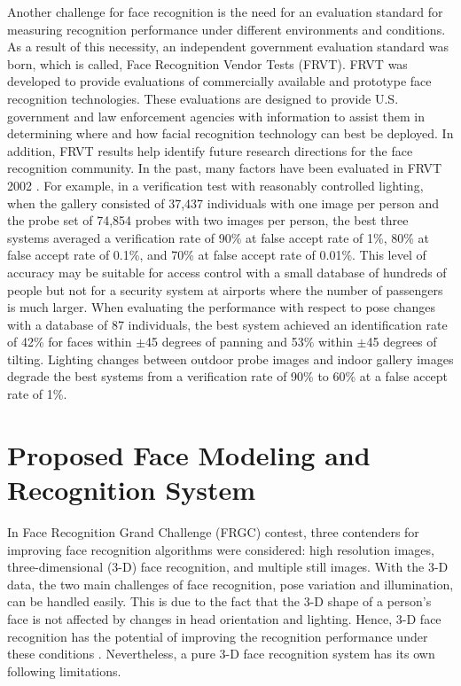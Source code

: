 Another challenge for face recognition is the need for an evaluation
standard for measuring recognition performance under different
environments and conditions. As a result of this necessity, an
independent government evaluation standard was born, which is
called, Face Recognition Vendor Tests (FRVT). FRVT was developed to
provide evaluations of commercially available and prototype face
recognition technologies. These evaluations are designed to provide
U.S. government and law enforcement agencies with information to
assist them in determining where and how facial recognition
technology can best be deployed. In addition, FRVT results help
identify future research directions for the face recognition
community. In the past, many factors have been evaluated in FRVT
2002 \cite{FRVT2002}. For example, in a verification test with
reasonably controlled lighting, when the gallery consisted of 37,437
individuals with one image per person and the probe set of 74,854
probes with two images per person, the best three systems averaged a
verification rate of 90\% at false accept rate of 1\%, 80\% at false
accept rate of 0.1\%, and 70\% at false accept rate of 0.01\%. This
level of accuracy may be suitable for access control with a small
database of hundreds of people but not for a security system at
airports where the number of passengers is much larger. When
evaluating the performance with respect to pose changes with a
database of 87 individuals, the best system achieved an
identification rate of 42\% for faces within $\pm$45 degrees of
panning and 53\% within $\pm$45 degrees of tilting. Lighting changes
between outdoor probe images and indoor gallery images degrade the
best systems from a verification rate of 90\% to 60\% at a false
accept rate of 1\%.

\section{Proposed Face Modeling and Recognition System}
In Face Recognition Grand Challenge (FRGC) contest, three contenders
for improving face recognition algorithms were considered: high
resolution images, three-dimensional (3-D) face recognition, and
multiple still images. With the 3-D data, the two main challenges of
face recognition, pose variation and illumination, can be handled
easily. This is due to the fact that the 3-D shape of a person's
face is not affected by changes in head orientation and lighting.
Hence, 3-D face recognition has the potential of improving the
recognition performance under these conditions
\cite{3DFaceSurvey2006}. Nevertheless, a pure 3-D face recognition
system has its own following limitations.

